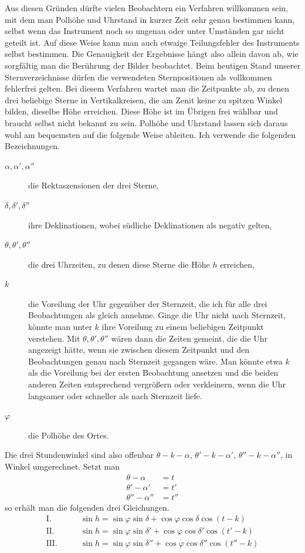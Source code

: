 Aus diesen Gründen dürfte vielen Beobachtern ein Verfahren willkommen sein, mit dem man Polhöhe und Uhrstand in kurzer Zeit sehr genau bestimmen kann, selbst wenn das Instrument noch so ungenau oder unter Umständen gar nicht geteilt ist. Auf diese Weise kann man auch etwaige Teilungsfehler des Instruments selbst bestimmen. Die Genauigkeit der Ergebnisse hängt also allein davon ab, wie sorgfältig man die Berührung der Bilder beobachtet. Beim heutigen Stand unserer Sternverzeichnisse dürfen die verwendeten Sternpositionen als vollkommen fehlerfrei gelten. Bei diesem Verfahren wartet man die Zeitpunkte ab, zu denen drei beliebige Sterne in Vertikalkreisen, die am Zenit keine zu spitzen Winkel bilden, dieselbe Höhe erreichen. Diese Höhe ist im Übrigen frei wählbar und braucht
%
selbst nicht bekannt zu sein. Polhöhe und Uhrstand lassen sich daraus wohl am bequemsten auf die folgende Weise ableiten. Ich verwende die folgenden Bezeichnungen.
\begin{description}
\item[$\alpha,\alpha',\alpha''$] die Rektaszensionen der drei Sterne,
\item[$\delta,\delta',\delta''$] ihre Deklinationen, wobei südliche Deklinationen als negativ gelten,
\item[$\theta,\theta',\theta''$] die drei Uhrzeiten, zu denen diese Sterne die Höhe $h$ erreichen,
\item[$k$] die Voreilung der Uhr gegenüber der Sternzeit, die ich für alle drei Beobachtungen als gleich annehme. Ginge die Uhr nicht nach Sternzeit, könnte man unter $k$ ihre Voreilung zu einem beliebigen Zeitpunkt verstehen. Mit $\theta,\theta',\theta''$ wären dann die Zeiten gemeint, die die Uhr angezeigt hätte, wenn sie zwischen diesem Zeitpunkt und den Beobachtungen genau nach Sternzeit gegangen wäre. Man könnte etwa $k$ als die Voreilung bei der ersten Beobachtung ansetzen und die beiden anderen Zeiten entsprechend vergrößern oder verkleinern, wenn die Uhr langsamer oder schneller als nach Sternzeit liefe.
\item[$\varphi$] die Polhöhe des Ortes.
\end{description}
Die drei Stundenwinkel sind also offenbar $\theta-k-\alpha$, $\theta'-k-\alpha'$, $\theta''-k-\alpha''$, in Winkel umgerechnet. Setzt man
\[
\begin{aligned}
\theta-\alpha&=t\\
\theta'-\alpha'&=t'\\
\theta''-\alpha''&=t''
\end{aligned}
\]
so erhält man die folgenden drei Gleichungen.
\[
\begin{aligned}
\mathrm{I.}\qquad&\sin h=\sin\varphi\sin\delta+\cos\varphi\cos\delta\cos(t-k)\\
\mathrm{II.}\qquad&\sin h=\sin\varphi\sin\delta'+\cos\varphi\cos\delta'\cos(t'-k)\\
\mathrm{III.}\qquad&\sin h=\sin\varphi\sin\delta''+\cos\varphi\cos\delta''\cos(t''-k)
\end{aligned}
\]

